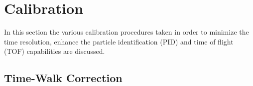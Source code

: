 \section{Calibration} \label{sec:calib}

In this section the various calibration procedures taken in order to minimize the time resolution, enhance the particle identification (PID) and time of flight (TOF) capabilities are discussed.

\subsection{Time-Walk Correction} \label{sec:calib_tw}

